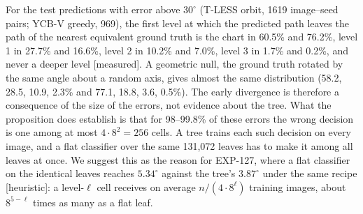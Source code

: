 \noindent For the test predictions with error above $30^\circ$ (T-LESS orbit, 1619 image--seed pairs; YCB-V greedy, 969), the
first level at which the predicted path leaves the path of the nearest equivalent ground truth is the chart in 60.5\% and 76.2\%,
level 1 in 27.7\% and 16.6\%, level 2 in 10.2\% and 7.0\%, level 3 in 1.7\% and 0.2\%, and never a deeper level [measured]. A
geometric null, the ground truth rotated by the same angle about a random axis, gives almost the same distribution (58.2, 28.5,
10.9, 2.3\% and 77.1, 18.8, 3.6, 0.5\%). The early divergence is therefore a consequence of the size of the errors, not evidence
about the tree. What the proposition does establish is that for 98--99.8\% of these errors the wrong decision is one among at
most $4\cdot8^2=256$ cells. A tree trains each such decision on every image, and a flat classifier over the same 131{,}072
leaves has to make it among all leaves at once. We suggest this as the reason for EXP-127, where a flat classifier on the
identical leaves reaches $5.34^\circ$ against the tree's $3.87^\circ$ under the same recipe [heuristic]: a level-$\ell$ cell receives
on average $n/(4\cdot8^{\ell})$ training images, about $8^{5-\ell}$ times as many as a flat leaf.

